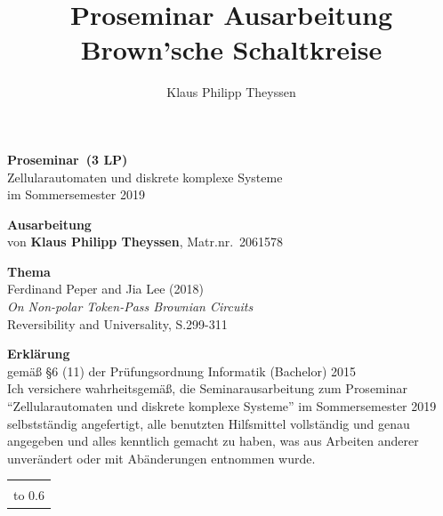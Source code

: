\documentclass[11pt,a4paper]{article}
\author{Klaus Philipp Theyssen}
\title{Proseminar Ausarbeitung Brown'sche Schaltkreise}
\newcommand{\teilnehmername}{Klaus Philipp Theyssen} %
\newcommand{\teilnehmermatrnr}{2061578}        %
\newcommand{\seminarart}{Proseminar}           %
\newcommand{\seminarlp}{3 LP}                  %
\newcommand{\seminarjahr}{2019}                %
\begin{document}
{\thispagestyle{empty}\large\sffamily\raggedright
%
%
\unskip %
\noindent \textbf{\Large \seminarart\ (\seminarlp)} 
\\[\baselineskip]
%
Zellularautomaten und diskrete komplexe Systeme
\\[1ex]
%
im Sommersemester \seminarjahr

\vspace*{3\baselineskip}

\noindent \textbf{\Large Ausarbeitung} \\[\baselineskip]
%
von \textbf{\teilnehmername}, Matr.nr.~\teilnehmermatrnr

\vspace*{3\baselineskip}

\noindent \textbf{\Large Thema} \\[\baselineskip]
%
%
 Ferdinand Peper and Jia Lee (2018)\\[1ex]
%
\textit{On Non-polar Token-Pass Brownian Circuits}\\[1ex]
%
Reversibility and Universality, S.299-311
}
\clearpage
{\thispagestyle{empty}\raggedright

\noindent \textbf{\Large Erklärung}\\[1ex]
gemäß \S 6 (11) der Prüfungsordnung Informatik %
(Bachelor) 2015 %
\\[\baselineskip]

\noindent
Ich versichere wahrheitsgemäß, die Seminarausarbeitung zum
\seminarart{} "`Zellularautomaten und diskrete komplexe Systeme"' im
Sommersemester \seminarjahr{} selbstständig angefertigt, alle
benutzten Hilfsmittel vollständig und genau angegeben und alles
kenntlich gemacht zu haben, was aus Arbeiten anderer unverändert oder
mit Abänderungen entnommen wurde.

\vspace*{30mm}
\noindent
\begin{tabular}{@{}l}
  \hline
   \\[-1ex]
  \hbox to 0.6\textwidth{(\teilnehmername, Matr.nr.~\teilnehmermatrnr) \hss}
\end{tabular}
}
\end{document}
